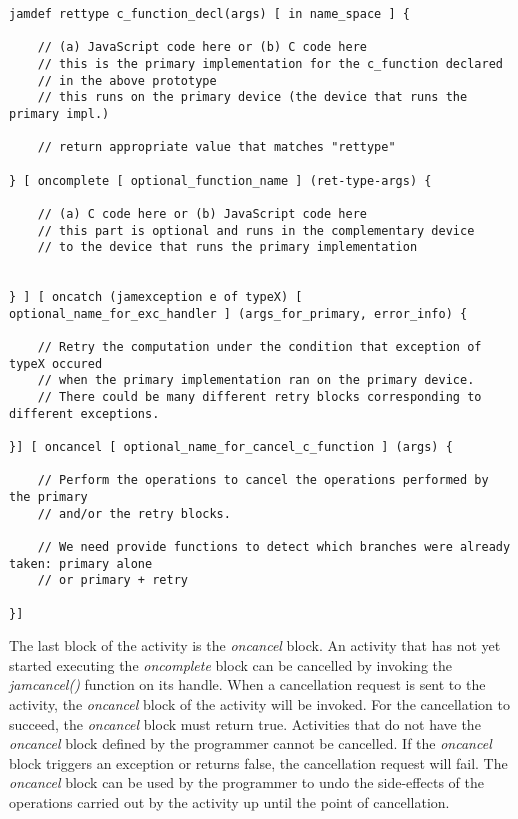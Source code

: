 \documentclass[11pt]{article}
\begin{document}
\begin{lstlisting}[caption=Syntax of the activity definition construct, label=activity_def]
jamdef rettype c_function_decl(args) [ in name_space ] {

    // (a) JavaScript code here or (b) C code here
    // this is the primary implementation for the c_function declared
    // in the above prototype
    // this runs on the primary device (the device that runs the primary impl.)

    // return appropriate value that matches "rettype"

} [ oncomplete [ optional_function_name ] (ret-type-args) {

    // (a) C code here or (b) JavaScript code here
    // this part is optional and runs in the complementary device
    // to the device that runs the primary implementation


} ] [ oncatch (jamexception e of typeX) [ optional_name_for_exc_handler ] (args_for_primary, error_info) {

    // Retry the computation under the condition that exception of typeX occured
    // when the primary implementation ran on the primary device.
    // There could be many different retry blocks corresponding to different exceptions.

}] [ oncancel [ optional_name_for_cancel_c_function ] (args) {

    // Perform the operations to cancel the operations performed by the primary
    // and/or the retry blocks.

    // We need provide functions to detect which branches were already taken: primary alone
    // or primary + retry

}]
\end{lstlisting}

The last block of the activity is the {\em oncancel} block. An activity that has
not yet started executing the {\em oncomplete} block can be cancelled by
invoking the {\em jamcancel()} function on its handle. When a cancellation
request is sent to the activity, the {\em oncancel} block of the activity will
be invoked. For the cancellation to succeed, the {\em oncancel} block must
return true. Activities that do not have the {\em oncancel} block defined by the
programmer cannot be cancelled. If the {\em oncancel} block triggers an
exception or returns false, the cancellation request will fail. The {\em
oncancel} block can be used by the programmer to undo the side-effects of the
operations carried out by the activity up until the point of cancellation.
\end{document}
